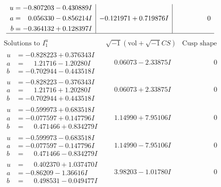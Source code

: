 \documentclass[1p]{elsarticle_modified}
\theoremstyle{definition}
\newcommand{\I}{\sqrt{-1}}
\begin{document}
$$\begin{array}{c|c|c}
\begin{aligned}
u &= -0.807203 - 0.430889 I \\
a &= \phantom{-}0.056330 - 0.856214 I \\
b &= -0.364132 + 0.128397 I\end{aligned}
 & -0.121971 + 0.719876 I & \phantom{-0.000000 } 0\\
 \hline 
 \end{array}$$\newpage$$\begin{array}{c|c|c}  
\text{Solutions to }I^u_{1}& \I (\text{vol} + \sqrt{-1}CS) & \text{Cusp shape}\\
 \hline 
\begin{aligned}
u &= -0.828223 + 0.376343 I \\
a &= \phantom{-}1.21716 - 1.20280 I \\
b &= -0.702944 - 0.443518 I\end{aligned}
 & \phantom{-}0.06073 - 2.33875 I & \phantom{-0.000000 } 0 \\ \hline\begin{aligned}
u &= -0.828223 - 0.376343 I \\
a &= \phantom{-}1.21716 + 1.20280 I \\
b &= -0.702944 + 0.443518 I\end{aligned}
 & \phantom{-}0.06073 + 2.33875 I & \phantom{-0.000000 } 0 \\ \hline\begin{aligned}
u &= -0.599973 + 0.683518 I \\
a &= -0.077597 + 0.147796 I \\
b &= \phantom{-}0.471466 + 0.834279 I\end{aligned}
 & \phantom{-}1.14990 + 7.95106 I & \phantom{-0.000000 } 0 \\ \hline\begin{aligned}
u &= -0.599973 - 0.683518 I \\
a &= -0.077597 - 0.147796 I \\
b &= \phantom{-}0.471466 - 0.834279 I\end{aligned}
 & \phantom{-}1.14990 - 7.95106 I & \phantom{-0.000000 } 0 \\ \hline\begin{aligned}
u &= \phantom{-}0.402370 + 1.037470 I \\
a &= -0.86209 - 1.36616 I \\
b &= \phantom{-}0.498531 - 0.049477 I\end{aligned}
 & \phantom{-}3.98203 - 1.01780 I & \phantom{-0.000000 } 0 \\ \hline\begin{aligned}

\end{aligned}
\end{array}$$
\end{document}
